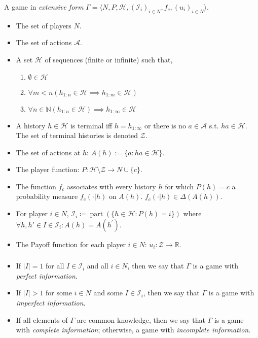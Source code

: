 \documentclass[UTF8,11pt,colorlinks,compress,openany]{beamer}%
\begin{document}
\begin{frame}\frametitle{}
\begin{definition}
	A game in \emph{extensive form} $\Gamma=\langle N,P,\mathcal{H},(\mathcal{I}_i)_{i\in N},f_c,(u_i)_{i\in N}\rangle$.
	\begin{itemize}
		\item The set of players $N$.
		\item The set of actions $\mathcal{A}$.
		\item A set $\mathcal{H}$ of sequences (finite or infinite) such that,
		\begin{enumerate}
			\item $\emptyset\in \mathcal{H}$
			\item $\forall m<n\left(h_{1:n}\in \mathcal{H}\implies h_{1:m}\in \mathcal{H}\right)$
			\item $\forall n\in\mathbb N\left(h_{1:n}\in \mathcal{H}\right)\implies h_{1:\infty}\in \mathcal{H}$
		\end{enumerate}
		\item A history $h\in \mathcal{H}$ is terminal iff $h=h_{1:\infty}$ or there is no $a\in \mathcal{A}$ s.t. $ha\in \mathcal{H}$. The set of terminal histories is denoted $\mathcal{Z}$.
		\item The set of actions at $h$: $A(h):=\{a:ha\in \mathcal{H}\}$.
		\item The player function: $P:\mathcal{H}\setminus \mathcal{Z}\to N\cup\{c\}$.
		\item The function $f_c$ associates with every history $h$ for which $P(h)=c$ a probability measure $f_c(\cdot|h)$ on $A(h)$. $f_c(\cdot|h)\in\Delta(A(h))$.
		\item For player $i\in N$, $\mathcal{I}_i\coloneqq \operatorname{part}(\{h\in \mathcal{H}:P(h)=i\})$ where $\forall h,h'\in I\in\mathcal{I}_i: A(h)=A(h^\prime)$.
		\item The Payoff function for each player $i\in N$: $u_i: \mathcal{Z}\to\mathbb R$.
	\end{itemize}
\end{definition}
\end{frame}

\begin{frame}\frametitle{}
\begin{itemize}
	\item If $|I|=1$ for all $I\in\mathcal{I}_i$ and all $i\in N$, then we say that $\Gamma$ is a game with \emph{perfect information}.
	\item If $|I|>1$ for some $i\in N$ and some $I\in\mathcal{I}_i$, then we say that $\Gamma$ is a game with \emph{imperfect information}.
	\item If all elements of $\Gamma$ are common knowledge, then we say that $\Gamma$ is a game with \emph{complete information}; otherwise, a game with \emph{incomplete information}.
\end{itemize}
\end{frame}
\end{document}
